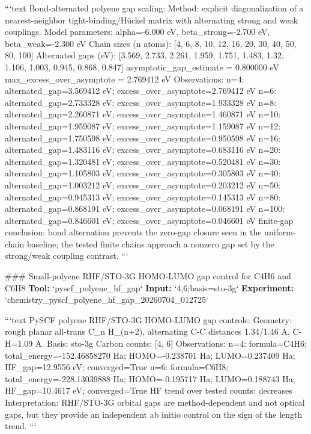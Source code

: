 \documentclass[11pt,a4paper]{article}
\begin{document}
```text
Bond-alternated polyene gap scaling:
  Method: explicit diagonalization of a nearest-neighbor tight-binding/Hückel matrix with alternating strong and weak couplings.
  Model parameters: alpha=-6.000 eV, beta\_strong=-2.700 eV, beta\_weak=-2.300 eV
  Chain sizes (n atoms): [4, 6, 8, 10, 12, 16, 20, 30, 40, 50, 80, 100]
  Alternated gaps (eV): [3.569, 2.733, 2.261, 1.959, 1.751, 1.483, 1.32, 1.106, 1.003, 0.945, 0.868, 0.847]
  asymptotic\_gap\_estimate = 0.800000 eV
  max\_excess\_over\_asymptote = 2.769412 eV
  Observations:
    n=4: alternated\_gap=3.569412 eV; excess\_over\_asymptote=2.769412 eV
    n=6: alternated\_gap=2.733328 eV; excess\_over\_asymptote=1.933328 eV
    n=8: alternated\_gap=2.260871 eV; excess\_over\_asymptote=1.460871 eV
    n=10: alternated\_gap=1.959087 eV; excess\_over\_asymptote=1.159087 eV
    n=12: alternated\_gap=1.750598 eV; excess\_over\_asymptote=0.950598 eV
    n=16: alternated\_gap=1.483116 eV; excess\_over\_asymptote=0.683116 eV
    n=20: alternated\_gap=1.320481 eV; excess\_over\_asymptote=0.520481 eV
    n=30: alternated\_gap=1.105803 eV; excess\_over\_asymptote=0.305803 eV
    n=40: alternated\_gap=1.003212 eV; excess\_over\_asymptote=0.203212 eV
    n=50: alternated\_gap=0.945313 eV; excess\_over\_asymptote=0.145313 eV
    n=80: alternated\_gap=0.868191 eV; excess\_over\_asymptote=0.068191 eV
    n=100: alternated\_gap=0.846601 eV; excess\_over\_asymptote=0.046601 eV
  finite-gap conclusion: bond alternation prevents the zero-gap closure seen in the uniform-chain baseline; the tested finite chains approach a nonzero gap set by the strong/weak coupling contrast.
```

\#\#\# Small-polyene RHF/STO-3G HOMO-LUMO gap control for C4H6 and C6H8
\textbf{Tool:} `pyscf\_polyene\_hf\_gap`
\textbf{Input:} `4,6;basis=sto-3g`
\textbf{Experiment:} `chemistry\_pyscf\_polyene\_hf\_gap\_20260704\_012725`

```text
PySCF polyene RHF/STO-3G HOMO-LUMO gap controls:
  Geometry: rough planar all-trans C\_n H\_(n+2), alternating C-C distances 1.34/1.46 A, C-H=1.09 A.
  Basis: sto-3g
  Carbon counts: [4, 6]
  Observations:
    n=4: formula=C4H6; total\_energy=-152.46858270 Ha; HOMO=-0.238701 Ha; LUMO=0.237409 Ha; HF\_gap=12.9556 eV; converged=True
    n=6: formula=C6H8; total\_energy=-228.13039888 Ha; HOMO=-0.195717 Ha; LUMO=0.188743 Ha; HF\_gap=10.4617 eV; converged=True
  HF trend over tested counts: decreases
  Interpretation: RHF/STO-3G orbital gaps are method-dependent and not optical gaps, but they provide an independent ab initio control on the sign of the length trend.
```
\end{document}
